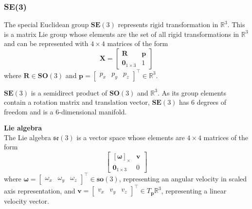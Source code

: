 	\subsubsection{\textbf{SE}(3)}	
		The special Euclidean group $\textbf{SE}(3)$ represents rigid transformation in $\mathbb{R}^3$. This is a matrix Lie group whose elements are the set of all rigid transformations in $\mathbb{R}^3$ and can be represented with $4 \times 4$ matrices of the form
		\begin{equation}
			\textbf{X} = 
			\begin{bmatrix}
				  \mathbf{R}	&	\mathbf{p} \\
				  \textbf{0}_{1 \times 3}		& 	1 
			\end{bmatrix}
		\end{equation}
		where $\mathbf{R} \in \mathbf{SO}(3)$ and 
		$\mathbf{p} = 
		\begin{bmatrix}
			p_x	& p_y & p_z				
		\end{bmatrix}
		^\top \in \mathbb{R}^3$.
		
		$\textbf{SE}(3)$ is a semidirect product of $\textbf{SO}(3)$ and $ \mathbb{R}^3$. As its group elements contain a rotation matrix and translation vector, $\textbf{SE}(3)$ has 6 degrees of freedom and is a 6-dimensional manifold.
			
		\textbf{Lie algebra}\\
		The Lie algebra $\mathfrak{se}(3)$ is a vector space whose elements are $4 \times 4$ matrices of the form
		\begin{equation}
			\begin{bmatrix}
				  [\mathbf{\omega}]_\times	&  \mathbf{v}\\
				  \textbf{0}_{1 \times 3} & 0						  
			\end{bmatrix}
		\end{equation}
		where $\mathbf{\omega} =
		\begin{bmatrix}
			\omega_x & \omega_y & \omega_z				
		\end{bmatrix}
		^\top \in \mathbf{so}(3)$, representing an angular velocity in scaled axis representation, and
		$\mathbf{v} = 
		\begin{bmatrix}
			v_x & v_y & v_z				
		\end{bmatrix}
		^\top \in T_{\mathbf{p}}\mathbb{R}^3$, representing a linear velocity vector.
		
